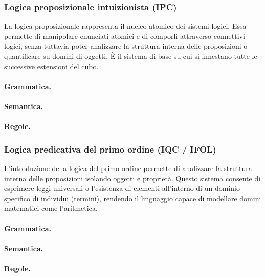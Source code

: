 \subsubsection{Logica proposizionale intuizionista (IPC)}
La logica proposizionale rappresenta il nucleo atomico dei sistemi logici. Essa permette di manipolare enunciati atomici e di comporli attraverso connettivi logici, 
senza tuttavia poter analizzare la struttura interna delle proposizioni o quantificare su domini di oggetti. È il sistema di base su cui si innestano tutte le successive 
estensioni del cubo.

\paragraph{Grammatica.}


\paragraph{Semantica.}


\paragraph{Regole.} \breakpara


\subsubsection{Logica predicativa del primo ordine (IQC / IFOL)}
L'introduzione della logica del primo ordine permette di analizzare la struttura interna delle proposizioni isolando oggetti e proprietà. Questo sistema consente di esprimere leggi universali o 
l'esistenza di elementi all'interno di un dominio specifico di individui (termini), rendendo il linguaggio capace di modellare domini matematici come l'aritmetica.

\paragraph{Grammatica.}


\paragraph{Semantica.}


\paragraph{Regole.} \breakpara


